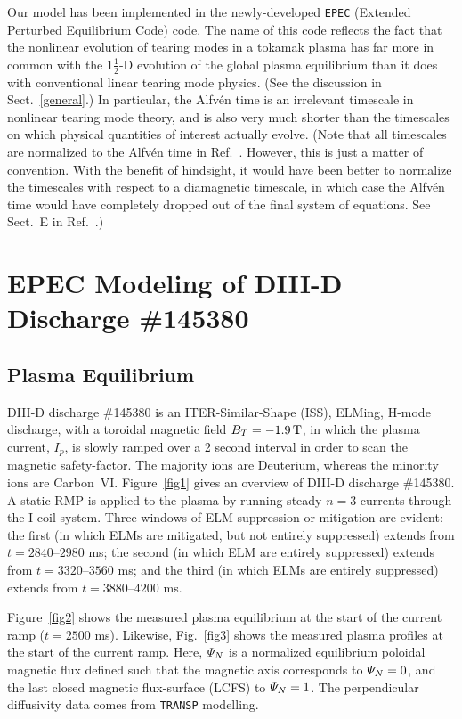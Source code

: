 \documentclass[12pt,prb,aps]{revtex4-1}
\begin{document}
Our model has been implemented in the newly-developed {\tt EPEC} (Extended Perturbed Equilibrium Code) code. The name
of this code reflects the fact that the nonlinear evolution of tearing modes in a
tokamak plasma has far more in common with the $1\tfrac{1}{2}$-D
evolution of the global plasma equilibrium than it does with
conventional linear tearing mode physics. (See the discussion in Sect.~\ref{general}.) In particular, the Alfv\'{e}n time is
an irrelevant timescale in nonlinear tearing mode theory, and
is also  very much shorter than the timescales on which
physical quantities of interest actually evolve. (Note that all timescales are normalized to the Alfv\'{e}n time
in Ref.~. However, this is just a matter of convention. With the benefit of hindsight, it would
have been better to normalize the timescales with respect to a diamagnetic timescale, in which case the Alfv\'{e}n time would have completely dropped
out of the final system of equations. See Sect.~E in Ref.~.)

\section{EPEC Modeling of DIII-D Discharge \#145380}
\subsection{Plasma Equilibrium}
DIII-D discharge \#145380 is an ITER-Similar-Shape (ISS), ELMing, H-mode discharge, with a toroidal magnetic field $B_T=-1.9\,{\rm T}$, in which the
plasma current, $I_p$, is slowly ramped over a 2 second interval in order to scan the magnetic safety-factor.\cite{d3d,d3d2} The majority ions are Deuterium, whereas the
minority ions are Carbon~VI.
Figure~\ref{fig1} gives an overview of DIII-D discharge \#145380. 
A static RMP is applied to the plasma by running steady $n=3$ currents through the I-coil system.\cite{icoil}
Three windows of ELM suppression or mitigation are evident: the first (in which ELMs are mitigated, but not
entirely suppressed) extends from $t=2840$--$2980$ ms; the
second (in which ELM are entirely suppressed) extends from $t=3320$--$3560$ ms; and the third (in which ELMs are
entirely suppressed) extends from $t=3880$--$4200$ ms.

Figure~\ref{fig2} shows the measured plasma equilibrium at the start of the current ramp ($t=2500$ ms). Likewise,
Fig.~\ref{fig3} shows the measured plasma profiles at the start of the current ramp. Here, ${\mit\Psi}_N$ is a
normalized equilibrium poloidal magnetic flux defined such that the magnetic axis corresponds to ${\mit\Psi}_N=0$, 
and the last closed magnetic flux-surface (LCFS) to ${\mit\Psi}_N=1$. The perpendicular
diffusivity data comes from {\tt TRANSP} modelling.\cite{transp}  
\end{document}
